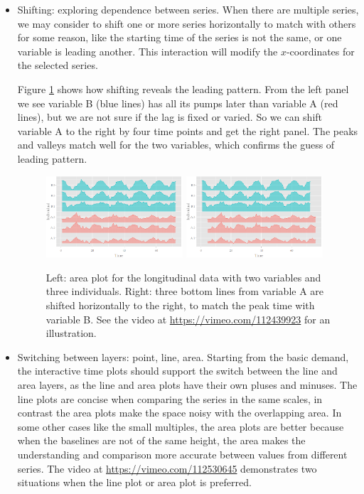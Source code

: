 \documentclass[12pt]{article}
\begin{document}
\begin{itemize}
\item Shifting: exploring dependence between series.
When there are multiple series, we may consider to shift one or more
series horizontally to match with others for some reason, like the
starting time of the series is not the same, or one variable is leading
another. This interaction will modify the $x$-coordinates for the selected
series.

Figure \ref{fig:x-shifting} shows how shifting reveals the leading
pattern. From the left panel we see variable B  (blue lines) has all
its pumps later than variable A  (red lines), but we are not sure if
the lag is fixed or varied. So we can shift variable A to the right
by four time points and get the right panel. The peaks and valleys
match well for the two variables, which confirms the guess of leading
pattern.

\begin{center}
\begin{figure}[htp]
\begin{centering}
\includegraphics[width=0.48\textwidth]{graph/pipeline-19-original}
\includegraphics[width=0.48\textwidth]{graph/pipeline-19-shifting}
\end{centering}
\caption{\label{fig:x-shifting}Left: area plot for the longitudinal data with
two variables and three individuals. Right: three bottom lines from
variable A are shifted horizontally to the right, to match the peak
time with variable B. See the video at \url{https://vimeo.com/112439923} for an illustration.}
\end{figure}
\end{center}


\item Switching between layers: point, line, area.
Starting from the basic demand, the interactive time plots should
support the switch between the line and area layers, as the line and
area plots have their own pluses and minuses. The line plots are concise
when comparing the series in the same scales, in contrast the area
plots make the space noisy with the overlapping area. In some other
cases like the small multiples, the area plots are better because
when the baselines are not of the same height, the area makes the
understanding and comparison more accurate between values from
different series. The video at \url{https://vimeo.com/112530645}
demonstrates two situations when the line plot or area plot is
preferred.


\end{itemize}
\end{document}
